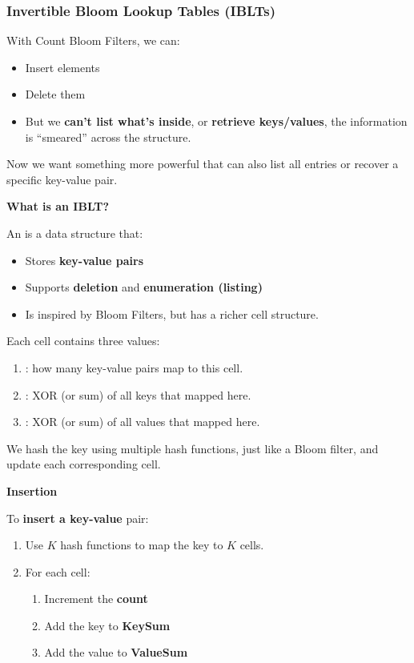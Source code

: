 \subsubsection{Invertible Bloom Lookup Tables (IBLTs)}\label{subsubsection: Invertible Bloom Lookup Tables}

With Count Bloom Filters, we can:
\begin{itemize}
    \item Insert elements
    \item Delete them
    \item But we \textbf{can't list what's inside}, or \textbf{retrieve keys/values}, the information is ``smeared'' across the structure.
\end{itemize}
Now we want something more powerful that can also list all entries or recover a specific key-value pair.

\highspace
\begin{flushleft}
    \textcolor{Green3}{ \textbf{What is an IBLT?}}
\end{flushleft}
An  is a data structure that:
\begin{itemize}
    \item Stores \textbf{key-value pairs}
    \item Supports \textbf{deletion} and \textbf{enumeration (listing)}
    \item Is inspired by Bloom Filters, but has a richer cell structure.
\end{itemize}
Each cell contains three values:
\begin{enumerate}
    \item {}: how many key-value pairs map to this cell.
    \item {}: XOR (or sum) of all keys that mapped here.
    \item {}: XOR (or sum) of all values that mapped here.
\end{enumerate}
We hash the key using multiple hash functions, just like a Bloom filter, and update each corresponding cell.

\highspace
\begin{flushleft}
    \textcolor{Green3}{ \textbf{Insertion}}
\end{flushleft}
To \textbf{insert a key-value} pair:
\begin{enumerate}
    \item Use $K$ hash functions to map the key to $K$ cells.
    \item For each cell:
    \begin{enumerate}
        \item Increment the \textbf{count}
        \item Add the key to \textbf{KeySum}
        \item Add the value to \textbf{ValueSum}
    \end{enumerate}
\end{enumerate}

